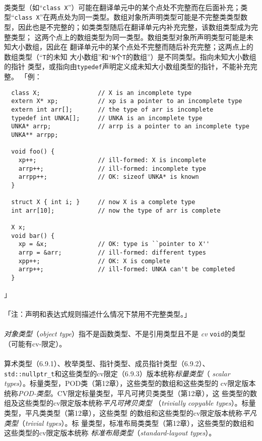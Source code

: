 \paragraph{}
类类型（如``\texttt{class X}''）可能在翻译单元中的某个点处不完整而在后面补充；类
型``\texttt{class X}''在两点处为同一类型。数组对象所声明类型可能是不完整类类型数
型，因此也是不完整的；如类类型随后在翻译单元内补充完整，该数组类型成为完整类型；
这两个点上的数组类型为同一类型。数组类型对象所声明类型可能是未知大小数组，因此在
翻译单元中的某个点处不完整而随后补充完整；这两点上的数组类型（``\texttt{T}的未知
大小数组''和``\texttt{N}个\texttt{T}的数组''）是不同类型。指向未知大小数组的指针
类型，或指向由\texttt{typedef}声明定义成未知大小数组类型的指针，不能补充完整。
「例：
\begin{lstlisting}
  class X;                // X is an incomplete type
  extern X* xp;           // xp is a pointer to an incomplete type
  extern int arr[];       // the type of arr is incomplete
  typedef int UNKA[];     // UNKA is an incomplete type
  UNKA* arrp;             // arrp is a pointer to an incomplete type
  UNKA** arrpp;

  void foo() {
    xp++;                 // ill-formed: X is incomplete
    arrp++;               // ill-formed: incomplete type
    arrpp++;              // OK: sizeof UNKA* is known
  }

  struct X { int i; }     // now X is a complete type
  int arr[10];            // now the type of arr is complete

  X x;
  void bar() {
    xp = &x;              // OK: type is ``pointer to X''
    arrp = &arr;          // ill-formed: different types
    xpp++;                // OK: X is complete
    arrp++;               // ill-formed: UNKA can't be completed
  }
\end{lstlisting}」

\paragraph{}
「注：声明和表达式规则描述什么情况下禁用不完整类型。」

\paragraph{}
\textit{对象类型}（\textit{object type}）指不是函数类型、不是引用类型且不是
\textit{cv} \texttt{void}的类型（可能有cv-限定）。

\paragraph{}
算术类型（6.9.1）、枚举类型、指针类型、成员指针类型（6.9.2）、
\texttt{std::nullptr\_t}和这些类型的cv限定（6.9.3）版本统称\textit{标量类型}（
\textit{scalar types}）。标量类型，POD类（第12章），这些类型的数组和这些类型的
cv限定版本统称\textit{POD-类型}。CV限定标量类型，平凡可拷贝类类型（第12章），这
些类型的数组及这些类型的cv限定版本统称\textit{平凡可拷贝类型}
（\textit{trivially copyable types}）。标量类型，平凡类类型（第12章），这些类型
的数组和这些类型的cv限定版本统称\textit{平凡类型}（\textit{trivial types}）。标
量类型，标准布局类类型（第12章），这些类型的数组和这些类型的cv限定版本统称
\textit{标准布局类型}（\textit{standard-layout types}）。

